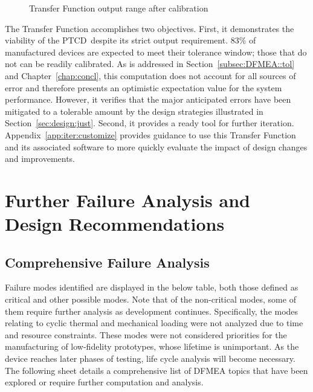 \documentclass[12pt, letterpaper]{report}%
\newcounter{mycounter}           %
\newcounter{sub}[mycounter]      %
\newcommand{\device}{PTCD}
\begin{document}
\begin{appendices}
\begin{figure}[H]
%
					\caption{Transfer Function output range after calibration}
					\label{fig:TF_cal}
			\end{figure}

			The Transfer Function accomplishes two objectives. First, it demonstrates the viability of the \device\ despite its strict output requirement. 83\% of manufactured devices are expected to meet their
			tolerance window; those that do not can be readily calibrated. As is addressed in Section~\ref{subsec:DFMEA::tol} and Chapter~\ref{chap:concl}, this computation does not account for all sources of error and therefore presents an optimistic
			expectation value for the system performance. However, it verifies that the major anticipated errors have been mitigated to a tolerable amount by the design strategies illustrated in Section~\ref{sec:design:just}.
			Second, it provides a ready tool for further iteration. Appendix~\ref{app:iter:customize} provides guidance to use this Transfer Function and its associated software to more quickly evaluate the impact of design changes and improvements.

\chapter{Further Failure Analysis and Design Recommendations}
\label{app:iter}

	\section{Comprehensive Failure Analysis}
	\label{app:iter:DFMEA}

		Failure modes identified are displayed in the below table, both those defined as critical and other possible modes. 
		Note that of the non-critical modes, some of them require further analysis as development continues.
		Specifically, the modes relating to cyclic thermal and mechanical loading were not analyzed 
		due to time and resource constraints. These modes were not considered priorities for the manufacturing 
		of low-fidelity prototypes, whose lifetime is unimportant. As the device reaches later phases of testing, life cycle analysis will become necessary.
		The following sheet details a comprehensive list of DFMEA topics that have been explored or require further computation and analysis.



\end{appendices}
\end{document}
